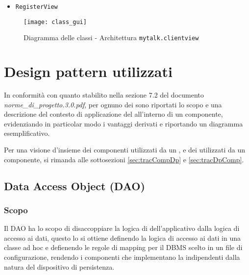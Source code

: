 \begin{itemize}[leftmargin=0em]
\item \texttt{RegisterView}

\end{itemize}

\begin{figure}[H]
  \centering
  \texttt{[image: class\_gui]}
  \caption{Diagramma delle classi - Architettura \texttt{mytalk.clientview}}\label{fig:sottoarchview}
\end{figure}
\clearpage

\section{Design pattern utilizzati}
In conformità con quanto stabilito nella sezione 7.2 del documento \textit{norme\_di\_progetto.3.0.pdf}, per ognuno dei  sono riportati lo scopo e una descrizione del contesto di applicazione del  all'interno di un componente, evidenziando in particolar modo i vantaggi derivati e riportando un diagramma esemplificativo.

Per una visione d'insieme dei componenti utilizzati da un , e dei  utilizzati da un componente, si rimanda alle sottosezioni \vref{sec:tracCompDp} e \vref{sec:tracDpComp}.


\subsection{Data Access Object (DAO)}\label{sec:patterndao}

\subsubsection{Scopo}
Il  DAO ha lo scopo di disaccoppiare la logica di  dell'applicativo dalla logica di accesso ai dati, questo lo si ottiene definendo la logica di accesso ai dati in una classe ad hoc e defienendo le regole di mapping per il DBMS scelto in un file di configurazione, rendendo i componenti che implementano la  indipendenti dalla natura del dispositivo di persistenza.

